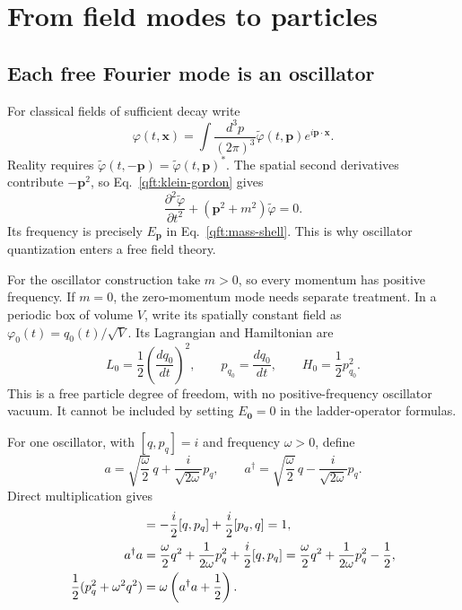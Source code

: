 \section{From field modes to particles}\label{qft:sec:quantization}
\subsection{Each free Fourier mode is an oscillator}
For classical fields of sufficient decay write
\begin{equation}\label{qft:spatial-fourier}
 \varphi(t,\mathbf x)=\int\frac{d^3p}{(2\pi)^3}
 \widetilde\varphi(t,\mathbf p)e^{i\mathbf p\cdot\mathbf x}.
\end{equation}
Reality requires
$\widetilde\varphi(t,-\mathbf p)=\widetilde\varphi(t,\mathbf p)^*$.
The spatial second derivatives contribute $-\mathbf p^2$, so
Eq.~\eqref{qft:klein-gordon} gives
\begin{equation}\label{qft:mode-oscillator}
 \frac{\partial^2\widetilde\varphi}{\partial t^2}
 +(\mathbf p^2+m^2)\widetilde\varphi=0.
\end{equation}
Its frequency is precisely $E_{\mathbf p}$ in
Eq.~\eqref{qft:mass-shell}. This is why oscillator quantization enters a
free field theory.

For the oscillator construction take $m>0$, so every momentum has
positive frequency. If $m=0$, the zero-momentum mode needs separate
treatment. In a periodic box of volume $V$, write its spatially constant
field as $\varphi_0(t)=q_0(t)/\sqrt V$. Its Lagrangian and Hamiltonian are
\begin{equation}\label{qft:massless-zero-mode}
 L_0=\frac12\left(\frac{dq_0}{dt}\right)^2,\qquad
 p_{q_0}=\frac{dq_0}{dt},\qquad H_0=\frac12p_{q_0}^2.
\end{equation}
This is a free particle degree of freedom, with no positive-frequency
oscillator vacuum. It cannot be included by setting $E_{\mathbf 0}=0$
in the ladder-operator formulas.

For one oscillator, with $[q,p_q]=i$ and frequency $\omega>0$, define
\begin{equation}\label{qft:oscillator-ladder}
 a=\sqrt{\frac\omega2}\,q+\frac{i}{\sqrt{2\omega}}p_q,
 \qquad
 a^\dagger=\sqrt{\frac\omega2}\,q-\frac{i}{\sqrt{2\omega}}p_q .
\end{equation}
Direct multiplication gives
\begin{align}
 [a,a^\dagger]
 &=-\frac i2[q,p_q]+\frac i2[p_q,q]=1,\notag\\
 a^\dagger a
 &=\frac\omega2q^2+\frac{1}{2\omega}p_q^2
   +\frac i2[q,p_q]
 =\frac\omega2q^2+\frac{1}{2\omega}p_q^2-\frac12,\notag\\
 \frac12(p_q^2+\omega^2q^2)&=\omega\left(a^\dagger a+\frac12\right).
 \label{qft:oscillator-energy}
\end{align}

